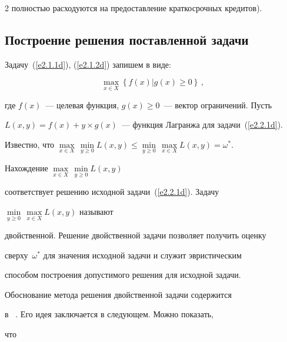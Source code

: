 \begin{multicols}{2}
полностью расходуются на предоставление краткосрочных кредитов). 





\subsection{Построение решения поставленной задачи} %


     


     Задачу~(\ref{e2.1.1d}), (\ref{e2.1.2d}) запишем в виде:


     \begin{equation}


     \underset{x\in X}{\max} \left \{f(x)\vert g(x)\geq 0\right \}\,,


     \label{e2.2.1d}


     \end{equation}


где $f(x)$~--- целевая функция, $g(x)\geq 0$~--- вектор ограничений. Пусть 


$L(x,y)=f(x)+y\times g(x)$~--- функция Лагранжа для задачи~(\ref{e2.2.1d}). 


Известно, что $\underset{x\in X}{\max}\,\underset{y\geq 0}{\min} L(x,y) \leq 


\underset{y\geq 0}{\min}\,\underset{x\in X}{\max} L(x,y)=\omega^*$.


     


     Нахождение $\underset{x\in X}{\max}\,\underset{y\geq 0}{\min} L(x,y)$ 


соответствует решению исходной задачи~(\ref{e2.2.1d}). Задачу 


$\underset{y\geq 0}{\min}\,\underset{x\in X}{\max} L(x,y)$ называют 


двойственной. Решение двойственной задачи позволяет получить оценку 


сверху~$\omega^*$ для значения исходной задачи и служит эвристическим 


способом построения допустимого решения для исходной задачи. 


Обоснование метода решения двойственной задачи содержится 


     в~\cite{1-dem} . Его идея заключается в следующем. Можно показать, 


что


\vspace*{-8pt}






\end{multicols}
